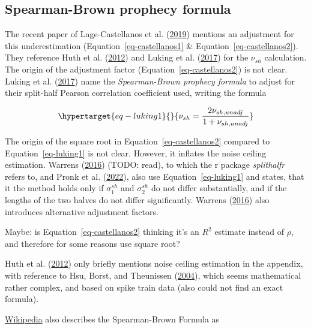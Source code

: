 \documentclass[
  letterpaper,
  DIV=11,
  numbers=noendperiod]{scrartcl}
\begin{document}
\hypertarget{sec-adj-sb}{%
\subsection{Spearman-Brown prophecy formula}\label{sec-adj-sb}}

The recent paper of Lage-Castellanos et al.
(\protect\hyperlink{ref-lage-castellanos2019}{2019}) mentions an
adjustment for this underestimation (Equation~\ref{eq-castellanos1} \&
Equation~\ref{eq-castellanos2}). They reference Huth et al.
(\protect\hyperlink{ref-huth2012}{2012}) and Luking et al.
(\protect\hyperlink{ref-luking2017}{2017}) for the \(\nu_{sh}\)
calculation. The origin of the adjustment factor
(Equation~\ref{eq-castellanos2}) is not clear. Luking et al.
(\protect\hyperlink{ref-luking2017}{2017}) name the \emph{Spearman-Brown
prophecy formula} to adjust for their split-half Pearson correlation
coefficient used, writing the formula

\begin{equation}\protect\hypertarget{eq-luking1}{}{
\nu_{sh} = \dfrac{2 \nu_{sh,unadj}}{1+ \nu_{sh,unadj}}
}\label{eq-luking1}\end{equation}

The origin of the square root in Equation~\ref{eq-castellanos2} compared
to Equation~\ref{eq-luking1} is not clear. However, it inflates the
noise ceiling estimation. Warrens
(\protect\hyperlink{ref-warrens2016}{2016}) (TODO: read), to which the r
package \emph{splithalfr} refers to, and Pronk et al.
(\protect\hyperlink{ref-pronk2022}{2022}), also use
Equation~\ref{eq-luking1} and states, that it the method holds only if
\(\sigma_1^{sh}\) and \(\sigma_2^{sh}\) do not differ substantially, and
if the lengths of the two halves do not differ significantly. Warrens
(\protect\hyperlink{ref-warrens2016}{2016}) also introduces alternative
adjustment factors.

Maybe: is Equation~\ref{eq-castellanos2} thinking it's an \(R^2\)
estimate instead of \(\rho\), and therefore for some reasons use square
root?

Huth et al. (\protect\hyperlink{ref-huth2012}{2012}) only briefly
mentions noise ceiling estimation in the appendix, with reference to
Hsu, Borst, and Theunissen (\protect\hyperlink{ref-hsu2004}{2004}),
which seems mathematical rather complex, and based on spike train data
(also could not find an exact formula).

\href{https://en.wikipedia.org/wiki/Spearman–Brown_prediction_formula}{Wikipedia}
also describes the Spearman-Brown Formula as
\end{document}
